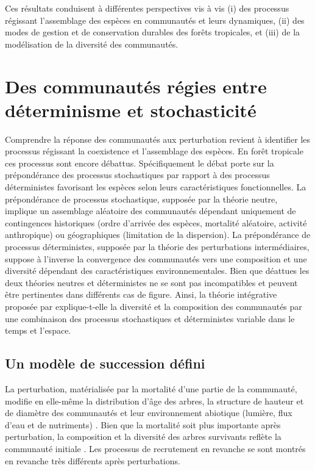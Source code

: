 \documentclass[
  11pt,
  french,
  A4paper,
  extrafontsizes,onecolumn,openright
  ]{memoir}
\begin{document}
Ces résultats conduisent à différentes perspectives vis à vis (i) des
processus régissant l'assemblage des espèces en communautés et leurs
dynamiques, (ii) des modes de gestion et de conservation durables des
forêts tropicales, et (iii) de la modélisation de la diversité des
communautés.

\section{Des communautés régies entre déterminisme et
stochasticité}\label{des-communautes-regies-entre-determinisme-et-stochasticite}

Comprendre la réponse des communautés aux perturbation revient à
identifier les processus régissant la coexistence et l'assemblage des
espèces. En forêt tropicale ces processus sont encore débattus.
Spécifiquement le débat porte sur la prépondérance des processus
stochastiques par rapport à des processus déterministes favorisant les
espèces selon leurs caractéristiques fonctionnelles. La prépondérance de
processus stochastique, supposée par la théorie neutre, implique un
assemblage aléatoire des communautés dépendant uniquement de
contingences historiques (ordre d'arrivée des espèces, mortalité
aléatoire, activité anthropique) ou géographiques (limitation de la
dispersion). La prépondérance de processus déterministes, supposée par
la théorie des perturbations intermédiaires, suppose à l'inverse la
convergence des communautés vers une composition et une diversité
dépendant des caractéristiques environnementales. Bien que déattues les
deux théories neutres et déterministes ne se sont pas incompatibles et
peuvent être pertinentes dans différents cas de figure. Ainsi, la
théorie intégrative proposée par \textcite{Chave2004} explique-t-elle la
diversité et la composition des communautés par une combinaison des
processus stochastiques et déterministes variable dans le temps et
l'espace.

\subsection{Un modèle de succession
défini}\label{un-modele-de-succession-defini}

La perturbation, matérialisée par la mortalité d'une partie de la
communauté, modifie en elle-même la distribution d'âge des arbres, la
structure de hauteur et de diamètre des communautés et leur
environnement abiotique (lumière, flux d'eau et de nutriments)
\autocites{Gourlet-Fleury2000}{Putz2012}{Piponiot2016}{Rutishauser2016}.
Bien que la mortalité soit plus importante après perturbation, la
composition et la diversité des arbres survivants reflète la communauté
initiale \autocite{Herault2018}. Les processus de recrutement en
revanche se sont montrés en revanche très différents après
perturbations.
\end{document}
